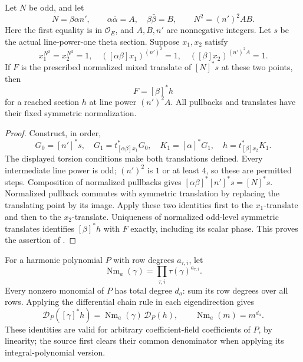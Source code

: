 \begin{srlemma}
\label{lem:ftb-mixed-pullback}
Let \(N\) be odd, and let
\[
 N=\beta\alpha n',\qquad
 \alpha\bar\alpha=A,\quad\beta\bar\beta=B,\qquad
                                N^2=(n')^2AB .
\]
Here the first equality is in \(\mathcal O_E\), and \(A,B,n'\) are
nonnegative integers.
Let \(s\) be the actual line-power-one theta section.
Suppose \(x_1,x_2\) satisfy
\[
 x_1^{N^2}=x_2^{N^2}=1,\quad
 ([\alpha\beta]x_1)^{(n')^2}=1,\quad
 ([\beta]x_2)^{(n')^2A}=1 .
\]
If \(F\) is the prescribed normalized mixed translate of
\([N]^*s\) at these two points, then
\[
                         F=[\beta]^*h
\]
for a reached section \(h\) at line power \((n')^2A\).
All pullbacks and translates have their fixed symmetric normalization.
\end{srlemma}
\begin{proof}
Construct, in order,
\[
 G_0=[n']^*s,\quad
 G_1=t_{[\alpha\beta]x_1}^*G_0,\quad
 K_1=[\alpha]^*G_1,\quad
 h=t_{[\beta]x_2}^*K_1 .
\]
The displayed torsion conditions make both translations defined.
Every intermediate line power is odd; \((n')^2\) is \(1\) or at
least \(4\), so these are permitted  steps.
Composition of normalized pullbacks gives
\([\alpha\beta]^*[n']^*s=[N]^*s\).
Normalized pullback commutes with symmetric translation by replacing
the translating point by its image.
Apply these two identities first to the \(x_1\)-translate and then
to the \(x_2\)-translate.
Uniqueness of normalized odd-level symmetric translates identifies
\([\beta]^*h\) with \(F\) exactly, including its scalar phase.
This proves the assertion of
.
\end{proof}

For a harmonic polynomial \(P\) with row degrees \(a_{\tau,i}\),
let
\[
                 \operatorname{Nm}_a(\gamma)
                  =\prod_{\tau,i}\tau(\gamma)^{a_{\tau,i}} .
\]
Every nonzero monomial of \(P\) has total degree \(d_a\):
sum its row degrees over all rows.
Applying the differential chain rule in each eigendirection gives
\[
 \mathcal D_P([\gamma]^*h)
          =\operatorname{Nm}_a(\gamma)\,\mathcal D_P(h),\qquad
 \operatorname{Nm}_a(m)=m^{d_a}.
\]
These identities are valid for arbitrary coefficient-field
coefficients of \(P\), by linearity; the source first clears their
common denominator when applying its integral-polynomial version.


